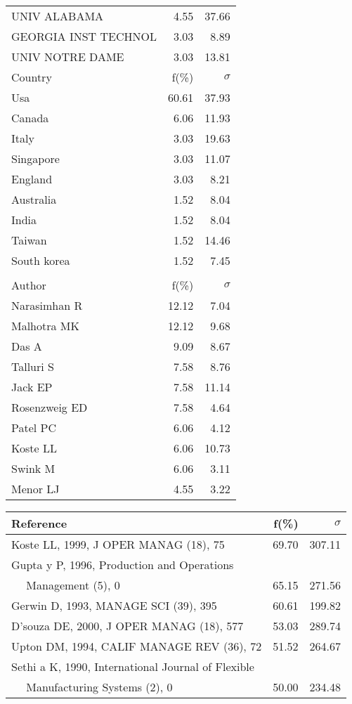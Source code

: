 \documentclass[a4paper,11pt]{report}
\begin{document}
\begin{landscape}
\begin{table}[!ht]
{\begin{tabular}{|l r r|}
UNIV ALABAMA & 4.55 & 37.66\\
GEORGIA INST TECHNOL & 3.03 & 8.89\\
UNIV NOTRE DAME & 3.03 & 13.81\\
\hline
\hline
Country & f(\%) & $\sigma$\\
\hline
Usa & 60.61 & 37.93\\
Canada & 6.06 & 11.93\\
Italy & 3.03 & 19.63\\
Singapore & 3.03 & 11.07\\
England & 3.03 & 8.21\\
Australia & 1.52 & 8.04\\
India & 1.52 & 8.04\\
Taiwan & 1.52 & 14.46\\
South korea & 1.52 & 7.45\\
 &  & \\
\hline
\hline
Author & f(\%) & $\sigma$\\
\hline
Narasimhan R & 12.12 & 7.04\\
Malhotra MK & 12.12 & 9.68\\
Das A & 9.09 & 8.67\\
Talluri S & 7.58 & 8.76\\
Jack EP & 7.58 & 11.14\\
Rosenzweig ED & 7.58 & 4.64\\
Patel PC & 6.06 & 4.12\\
Koste LL & 6.06 & 10.73\\
Swink M & 6.06 & 3.11\\
Menor LJ & 4.55 & 3.22\\
\hline
\end{tabular}
}
{\scriptsize\begin{tabular}{|l r r|}
\hline
Reference & f(\%) & $\sigma$\\
\hline
Koste LL, 1999, J OPER MANAG (18), 75 & 69.70 & 307.11\\
Gupta y P, 1996, Production and Operations &  & \\
$\quad$ Management (5), 0 & 65.15 & 271.56\\
Gerwin D, 1993, MANAGE SCI (39), 395 & 60.61 & 199.82\\
D'souza DE, 2000, J OPER MANAG (18), 577 & 53.03 & 289.74\\
Upton DM, 1994, CALIF MANAGE REV (36), 72 & 51.52 & 264.67\\
Sethi a K, 1990, International Journal of Flexible &  & \\
$\quad$ Manufacturing Systems (2), 0 & 50.00 & 234.48\\

\end{tabular}}
\end{table}
\end{landscape}
\end{document}
